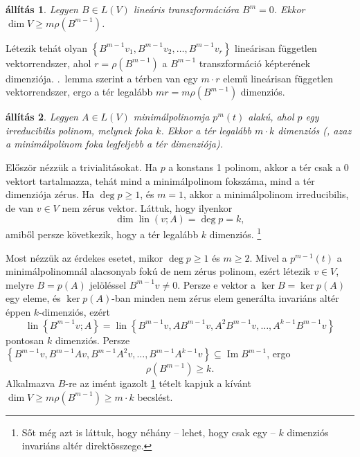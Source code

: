 \documentclass[9pt, a4paper, showtrims]{memoir}
\makeatletter
\let\Aref\relax
\renewenvironment{proof}[1][\proofname]
    {\par\pushQED{\qed}%
    \normalfont \topsep6\p@\@plus6\p@\relax
    \trivlist
    \item[\hskip\labelsep
        \itshape
    #1\@addpunct{:}]\ignorespaces}
    {\popQED\endtrivlist\@endpefalse}
\theoremstyle{plain}
\newtheorem{proposition}{állítás}[chapter]
\theoremstyle{remark}
\theoremstyle{definition}
\DeclareMathOperator{\lin}{lin}
\DeclareMathOperator{\im}{Im}
\makeatother
\begin{document}
    \begin{proposition}
        Legyen $B\in L\left( V \right)$ lineáris transzformációra $B^m=0$.
        Ekkor $\dim V\geq m\rho\left( B^{m-1} \right)$.
        \label{th:nilldim}
    \end{proposition}
    \begin{proof}
        Létezik tehát olyan $\left\{ B^{m-1}v_1,B^{m-1}v_2,\dots,B^{m-1}v_r \right\}$
        lineárisan független vektorrendszer, ahol $r=\rho(B^{m-1})$ a $B^{m-1}$ transzformáció képterének dimenziója.
        \Aref{le:nillp-fgtlen}.~lemma szerint a térben van egy $m\cdot r$ elemű lineárisan független vektorrendszer,
        ergo a tér legalább $mr=m\rho\left( B^{m-1} \right)$ dimenziós.
    \end{proof}
    \begin{proposition}
        Legyen $A\in L\left( V \right)$ minimálpolinomja 
        $
        p^{m}\left( t \right)
        $
        alakú,
        ahol $p$ egy irreducibilis polinom, melynek foka $k$.
        Ekkor a tér legalább $m\cdot k$ dimenziós 
        (, azaz a minimálpolinom foka legfeljebb a tér dimenziója).
        \label{th:minpol1}
    \end{proposition}
    \begin{proof}
        Először nézzük a trivialitásokat.
        Ha $p$ a konstans 1 polinom, akkor a tér csak a 0 vektort tartalmazza,
        tehát mind a minimálpolinom fokszáma, mind a tér dimenziója zérus.
        Ha $\deg p\geq 1$, és $m=1$, akkor a minimálpolinom irreducibilis, 
        de van $v\in V$ nem zérus vektor.
        Láttuk, hogy ilyenkor 
        \[
            \dim\lin\left( v;A \right)=\deg p=k,
        \]
        amiből persze következik, hogy a tér legalább $k$ dimenziós.
        \footnote{Sőt még azt is láttuk, hogy néhány -- lehet, hogy csak egy -- $k$ dimenziós invariáns altér direktösszege.}

        Most nézzük az érdekes esetet, 
        mikor $\deg p\geq 1$ és $m\geq 2$.
        Mivel a 
        \begin{math}
            p^{m-1}\left( t \right)
        \end{math}
        a minimálpolinomnál alacsonyab fokú de nem zérus polinom,  
        ezért létezik $v\in V$, melyre $B=p\left( A \right)$ jelöléssel
        \(
        B^{m-1}v\neq 0.
        \)
        Persze e vektor a $\ker B=\ker p\left( A \right)$ 
        egy eleme, 
        és $\ker p\left( A \right)$-ban minden nem zérus elem generálta invariáns altér éppen $k$-dimenziós,
        ezért 
        \[
            \lin\left\{ B^{m-1}v;A \right\}=
            \lin\left\{ 
                B^{m-1}v,
                AB^{m-1}v,
                A^2B^{m-1}v,
                \ldots,
                A^{k-1}B^{m-1}v
            \right\}
        \]
        pontosan $k$ dimenziós.
        Persze $\left\{ B^{m-1}v,B^{m-1}Av,B^{m-1}A^2v,\dots,B^{m-1}A^{k-1}v \right\}\subseteq \im B^{m-1}$,
        ergo 
        \[
            \rho\left( B^{m-1}\right)\geq k.
        \]
        Alkalmazva $B$-re az imént igazolt \ref{th:nilldim} tételt kapjuk a kívánt
        \(
        \dim V\geq m\rho\left( B^{m-1} \right)\geq m\cdot k
        \)
        becslést.
    \end{proof}
\end{document}
